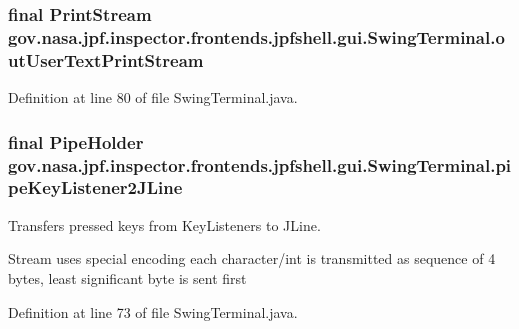 \subsubsection[{\texorpdfstring{out\+User\+Text\+Print\+Stream}{outUserTextPrintStream}}]{\setlength{\rightskip}{0pt plus 5cm}final Print\+Stream gov.\+nasa.\+jpf.\+inspector.\+frontends.\+jpfshell.\+gui.\+Swing\+Terminal.\+out\+User\+Text\+Print\+Stream\hspace{0.3cm}{\ttfamily [private]}}\hypertarget{classgov_1_1nasa_1_1jpf_1_1inspector_1_1frontends_1_1jpfshell_1_1gui_1_1_swing_terminal_a858dd7cfff236d8457477e83c83dc3a7}{}\label{classgov_1_1nasa_1_1jpf_1_1inspector_1_1frontends_1_1jpfshell_1_1gui_1_1_swing_terminal_a858dd7cfff236d8457477e83c83dc3a7}


Definition at line 80 of file Swing\+Terminal.\+java.

\subsubsection[{\texorpdfstring{pipe\+Key\+Listener2\+J\+Line}{pipeKeyListener2JLine}}]{\setlength{\rightskip}{0pt plus 5cm}final {\bf Pipe\+Holder} gov.\+nasa.\+jpf.\+inspector.\+frontends.\+jpfshell.\+gui.\+Swing\+Terminal.\+pipe\+Key\+Listener2\+J\+Line\hspace{0.3cm}{\ttfamily [private]}}\hypertarget{classgov_1_1nasa_1_1jpf_1_1inspector_1_1frontends_1_1jpfshell_1_1gui_1_1_swing_terminal_a2badde6f25f6dd8f3b3b60714cc3105a}{}\label{classgov_1_1nasa_1_1jpf_1_1inspector_1_1frontends_1_1jpfshell_1_1gui_1_1_swing_terminal_a2badde6f25f6dd8f3b3b60714cc3105a}


Transfers pressed keys from Key\+Listeners to J\+Line. 

Stream uses special encoding each character/int is transmitted as sequence of 4 bytes, least significant byte is sent first 

Definition at line 73 of file Swing\+Terminal.\+java.

